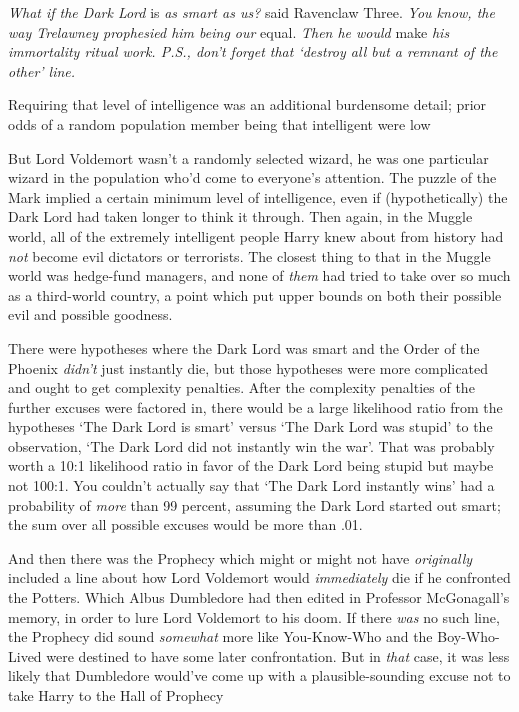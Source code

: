 \emph{What if the Dark Lord} is \emph{as smart as us?} said Ravenclaw Three.
\emph{You know, the way Trelawney prophesied him being our} equal. \emph{Then
he would} make \emph{his immortality ritual work. P.S., don't forget that
`destroy all but a remnant of the other' line.}

Requiring that level of intelligence was an additional burdensome detail; prior
odds of a random population member being that intelligent were low{\el}

But Lord Voldemort wasn't a randomly selected wizard, he was one particular
wizard in the population who'd come to everyone's attention. The puzzle of the
Mark implied a certain minimum level of intelligence, even if (hypothetically)
the Dark Lord had taken longer to think it through. Then again, in the Muggle
world, all of the extremely intelligent people Harry knew about from history
had \emph{not} become evil dictators or terrorists. The closest thing to that
in the Muggle world was hedge-fund managers, and none of \emph{them} had tried
to take over so much as a third-world country, a point which put upper bounds
on both their possible evil and possible goodness.

There were hypotheses where the Dark Lord was smart and the Order of the
Phoenix \emph{didn't} just instantly die, but those hypotheses were more
complicated and ought to get complexity penalties. After the complexity
penalties of the further excuses were factored in, there would be a large
likelihood ratio from the hypotheses `The Dark Lord is smart' versus `The Dark
Lord was stupid' to the observation, `The Dark Lord did not instantly win the
war'. That was probably worth a 10:1 likelihood ratio in favor of the Dark Lord
being stupid{\el} but maybe not 100:1. You couldn't actually say that `The
Dark Lord instantly wins' had a probability of \emph{more} than 99 percent,
assuming the Dark Lord started out smart; the sum over all possible excuses
would be more than .01.

And then there was the Prophecy{\el} which might or might not have
\emph{originally} included a line about how Lord Voldemort would
\emph{immediately} die if he confronted the Potters. Which Albus Dumbledore had
then edited in Professor McGonagall's memory, in order to lure Lord Voldemort
to his doom. If there \emph{was} no such line, the Prophecy did sound
\emph{somewhat} more like You-Know-Who and the Boy-Who-Lived were destined to
have some later confrontation. But in \emph{that} case, it was less likely that
Dumbledore would've come up with a plausible-sounding excuse not to take Harry
to the Hall of Prophecy{\el}

